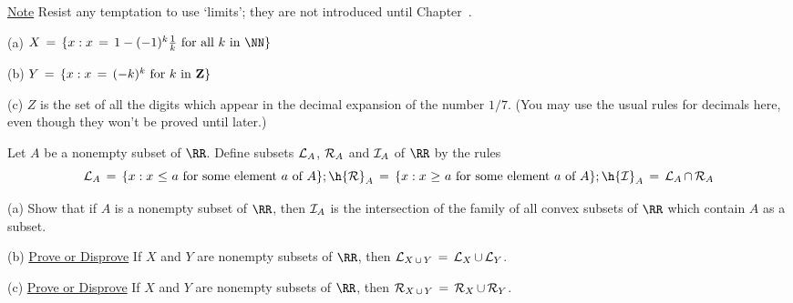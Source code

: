         \underline{Note} Resist any temptation to use `limits'; they are not introduced until Chapter~.

\V

        (a) $X \,=\, \{x: x \,=\, 1-(-1)^{k}\frac{1}{k} \mbox{ for all $k$ in ${\NN}$}\}$

\V

        (b) $Y \,=\, \{x: x \,=\, (-k)^{k} \mbox{ for $k$ in {\bf Z}}\}$

\V

        (c) $Z$ is the set of all the digits which appear in the decimal expansion of the number $1/7$.
    (You may use the usual rules for decimals here, even though they won't be proved until later.)

\V
\V

\noindent {} Let $A$ be a nonempty subset of ${\RR}$. Define subsets ${\cal L}_{A}$, ${\cal R}_{A}$ and ${\cal I}_{A}$ of ${\RR}$ by the rules
        \begin{displaymath}
        {\cal L}_{A} \,=\, \{x: x\,\,{\leq}\,\,a \mbox{ for some element $a$ of $A$}\}; \h
        {\cal R}_{A} \,=\, \{x: x\,\,{\geq}\,\,a \mbox{ for some element $a$ of $A$}\}; \h
        {\cal I}_{A} \,=\, {\cal L}_{A}\,{\cap}\,{\cal R}_{A}
        \end{displaymath}

\V

        (a) Show that if $A$ is a nonempty subset of ${\RR}$, then ${\cal I}_{A}$ is the intersection of the family of all convex subsets of ${\RR}$ which contain $A$ as a subset.

\V

        (b) \underline{Prove or Disprove} If $X$ and $Y$ are nonempty subsets of ${\RR}$, then ${\cal L}_{X\,{\cup}\,Y} \,=\, {\cal L}_{X}\,{\cup}\,{\cal L}_{Y}$.

\V

        (c) \underline{Prove or Disprove} If $X$ and $Y$ are nonempty subsets of ${\RR}$, then ${\cal R}_{X\,{\cup}\,Y} \,=\, {\cal R}_{X}\,{\cup}\,{\cal R}_{Y}$.


\V
\V

